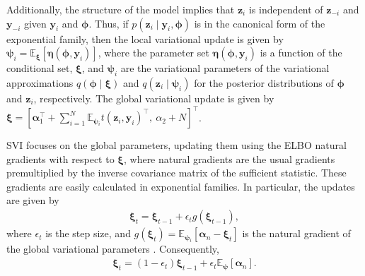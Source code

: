 Additionally, the structure of the model implies that $\boldsymbol{z}_i$ is independent of $\boldsymbol{z}_{-i}$ and $\boldsymbol{y}_{-i}$ given $\boldsymbol{y}_i$ and $\boldsymbol{\phi}$. Thus, if $p(\boldsymbol{z}_i \mid \boldsymbol{y}_i, \boldsymbol{\phi})$ is in the canonical form of the exponential family, then the local variational update is given by $\boldsymbol{\psi}_i = \mathbb{E}_{\boldsymbol{\xi}}[\boldsymbol{\eta}(\boldsymbol{\phi}, \boldsymbol{y}_i)]$, where the parameter set $\boldsymbol{\eta}(\boldsymbol{\phi}, \boldsymbol{y}_i)$ is a function of the conditional set, $\boldsymbol{\xi}$, and $\boldsymbol{\psi}_i$ are the variational parameters of the variational approximations $q(\boldsymbol{\phi} \mid \boldsymbol{\xi})$ and $q(\boldsymbol{z}_i \mid \boldsymbol{\psi}_i)$ for the posterior distributions of $\boldsymbol{\phi}$ and $\boldsymbol{z}_i$, respectively. The global variational update is given by $\boldsymbol{\xi} = [\boldsymbol{\alpha}_1^{\top} + \sum_{i=1}^N \mathbb{E}_{\boldsymbol{\psi}_i} t(\boldsymbol{z}_i, \boldsymbol{y}_i)^{\top}, \ \alpha_2 + N]^{\top}$.

SVI focuses on the global parameters, updating them using the ELBO natural gradients with respect to $\boldsymbol{\xi}$, where natural gradients are the usual gradients premultiplied by the inverse covariance matrix of the sufficient statistic. These gradients are easily calculated in exponential families. In particular, the updates are given by
\begin{align*}
	\boldsymbol{\xi}_t=\boldsymbol{\xi}_{t-1}+\epsilon_t g(\boldsymbol{\xi}_{t-1}),
\end{align*} 
where $\epsilon_t$ is the step size, and $g(\boldsymbol{\xi}_t)=\mathbb{E}_{\boldsymbol{\psi}_i}[\boldsymbol{\alpha}_n-\boldsymbol{\xi}_t]$ is the natural gradient of the global variational parameters  \cite{blei2017variational}. Consequently,
\begin{align*}
	\boldsymbol{\xi}_t=(1-\epsilon_t)\boldsymbol{\xi}_{t-1}+\epsilon_t \mathbb{E}_{\boldsymbol{\psi}}[\boldsymbol{\alpha}_n].
\end{align*}    

